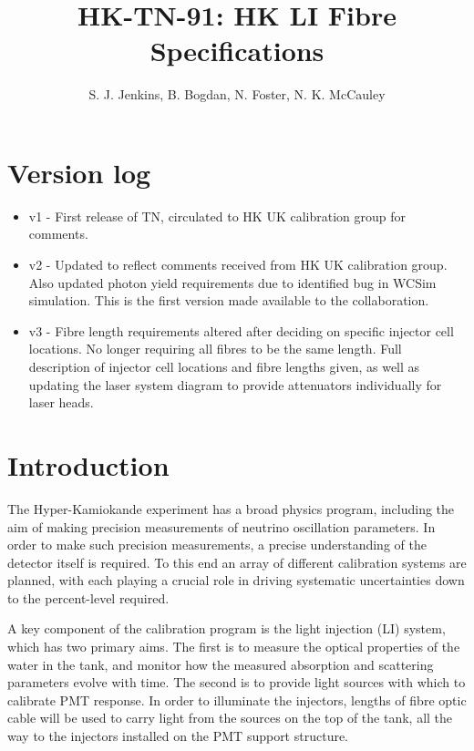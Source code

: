 \documentclass[a4paper,11pt]{article}
\begin{document}
\title{\huge{HK-TN-91: HK LI Fibre Specifications}}
\author{S. J. Jenkins, B. Bogdan, N. Foster, N. K. McCauley}

\maketitle

\tableofcontents

\newpage

\section{Version log}
\begin{itemize}
\item v1 - First release of TN, circulated to HK UK calibration group for comments.
\item v2 - Updated to reflect comments received from HK UK calibration group. Also updated photon yield requirements due to identified bug in WCSim simulation. This is the first version made available to the collaboration.
\item v3 - Fibre length requirements altered after deciding on specific injector cell locations. No longer requiring all fibres to be the same length. Full description of injector cell locations and fibre lengths given, as well as updating the laser system diagram to provide attenuators individually for laser heads.
\end{itemize}

\clearpage
\newpage

\section{Introduction}\label{sec:intro}
The Hyper-Kamiokande experiment has a broad physics program, including the aim of making precision measurements of neutrino oscillation parameters. In order to make such precision measurements, a precise understanding of the detector itself is required. To this end an array of different calibration systems are planned, with each playing a crucial role in driving systematic uncertainties down to the percent-level required.

A key component of the calibration program is the light injection (LI) system, which has two primary aims. The first is to measure the optical properties of the water in the tank, and monitor how the measured absorption and scattering parameters evolve with time. The second is to provide light sources with which to calibrate PMT response. In order to illuminate the injectors, lengths of fibre optic cable will be used to carry light from the sources on the top of the tank, all the way to the injectors installed on the PMT support structure.
\end{document}
